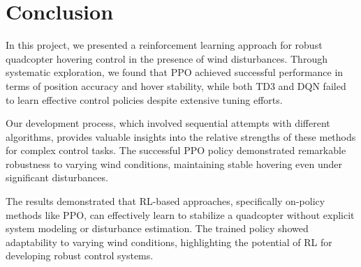 \documentclass[12pt]{article}
\begin{document}
%     
%     
%     
%     

\section{Conclusion}

In this project, we presented a reinforcement learning approach for robust quadcopter hovering control in the presence of wind disturbances. Through systematic exploration, we found that PPO achieved successful performance in terms of position accuracy and hover stability, while both TD3 and DQN failed to learn effective control policies despite extensive tuning efforts.


Our development process, which involved sequential attempts with different algorithms, provides valuable insights into the relative strengths of these methods for complex control tasks. The successful PPO policy demonstrated remarkable robustness to varying wind conditions, maintaining stable hovering even under significant disturbances.


The results demonstrated that RL-based approaches, specifically on-policy methods like PPO, can effectively learn to stabilize a quadcopter without explicit system modeling or disturbance estimation. The trained policy showed adaptability to varying wind conditions, highlighting the potential of RL for developing robust control systems.
\end{document}
